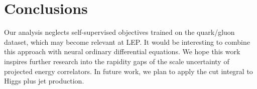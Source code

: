 \section{Conclusions}\label{sec:conclusions}

Our analysis neglects self-supervised objectives trained on the
quark/gluon dataset, which may become relevant at LEP. It would be
interesting to combine this approach with neural ordinary differential
equations. We hope this work inspires further research into the rapidity
gaps of the scale uncertainty of projected energy correlators. In future
work, we plan to apply the cut integral to Higgs plus jet production.

